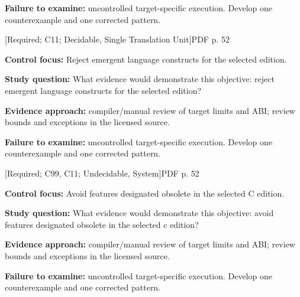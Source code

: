 \documentclass[10pt,letterpaper]{article}
\begin{document}
\textbf{Failure to examine:} uncontrolled target-specific execution. Develop one counterexample and one corrected pattern.\par
\smallskip
{}
 \textsf{\footnotesize [Required; C11; Decidable, Single Translation Unit]}\hfill{\footnotesize PDF p. 52}\par
\textbf{Control focus:} Reject emergent language constructs for the selected edition.\par
\textbf{Study question:} What evidence would demonstrate this objective: reject emergent language constructs for the selected edition?\par
\textbf{Evidence approach:} compiler/manual review of target limits and ABI; review bounds and exceptions in the licensed source.\par
\textbf{Failure to examine:} uncontrolled target-specific execution. Develop one counterexample and one corrected pattern.\par
\smallskip
{}
 \textsf{\footnotesize [Required; C99, C11; Undecidable, System]}\hfill{\footnotesize PDF p. 52}\par
\textbf{Control focus:} Avoid features designated obsolete in the selected C edition.\par
\textbf{Study question:} What evidence would demonstrate this objective: avoid features designated obsolete in the selected c edition?\par
\textbf{Evidence approach:} compiler/manual review of target limits and ABI; review bounds and exceptions in the licensed source.\par
\textbf{Failure to examine:} uncontrolled target-specific execution. Develop one counterexample and one corrected pattern.\par
\smallskip
\end{document}
